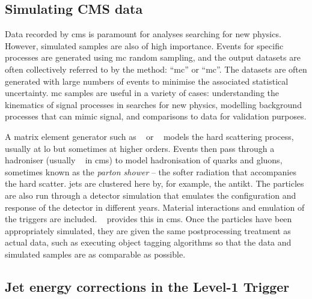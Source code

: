 



\subsection{Simulating CMS data}
\label{subsec:cms_mc}

Data recorded by \acrshort{cms} is paramount for analyses searching for new physics. However, simulated samples are also of high importance. Events for specific processes are generated using \acrfull{mc} random sampling, and the output datasets are often collectively referred to by the method: ``\acrlong{mc}'' or ``\acrshort{mc}''. The datasets are often generated with large numbers of events to minimise the associated statistical uncertainty. \acrshort{mc} samples are useful in a variety of cases: understanding the kinematics of signal processes in searches for new physics, modelling background processes that can mimic signal, and comparisons to data for validation purposes.

A matrix element generator such as \madgraph~\cite{Alwall:2014hca} or \POWHEG~\cite{Nason:2004rx,Frixione:2007vw} models the hard scattering process, usually at \acrfull{lo} but sometimes at higher orders. Events then pass through a hadroniser (usually \PYTHIA~\cite{pythia82} in \acrshort{cms}) to model hadronisation of quarks and gluons, sometimes known as the \emph{parton shower} -- the softer radiation that accompanies the hard scatter. \Glspl{jet} are clustered here by, for example, the \gls{antikt}. The particles are also run through a detector simulation that emulates the configuration and response of the detector in different years. Material interactions and emulation of the triggers are included. \GEANTfour~\cite{AGOSTINELLI2003250,1610988,ALLISON2016186} provides this in \acrshort{cms}. Once the particles have been appropriately simulated, they are given the same postprocessing treatment as actual data, such as executing object tagging algorithms so that the data and simulated samples are as comparable as possible.




\subsection{Jet energy corrections in the Level-1 Trigger}
\label{subsec:detector_jecs}

